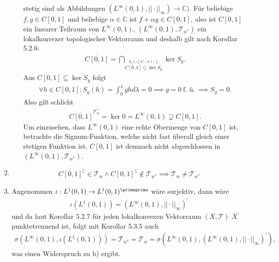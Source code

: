 \begin{solution}
\begin{enumerate}[label = (\alph*)]
\begin{enumerate}
      stetig sind als Abbildungen $(L^{\infty}(0,1),||\cdot||_{\infty}) \rightarrow \mathbb{C})$.
      Für beliebige $f,g \in C[0,1]$ und beliebige $\alpha \in \mathbb{C}$ ist $f + \alpha g \in C[0,1]$,
      also ist $C[0,1]$ ein linearer Teilraum von $L^{\infty}(0,1)$, $(L^{\infty}(0,1),\mathcal{T}_{w^*})$
      ein lokalkonvexer topologischer Vektorraum und deshalb
      gilt nach Korollar 5.2.6:
      \begin{align*}
        \overline{C[0,1]} = \bigcap_{\stackrel{S_g \in \iota(L^1(0,1))}{C[0,1] \subseteq \ker S_g}} \ker S_g.
      \end{align*}
      Aus $C[0,1] \subseteq \ker S_g$ folgt
      \begin{align*}
        \forall h \in C[0,1]: S_g(h) = \int_0^1 gh d\lambda = 0
        \implies g = 0 ~\text{f. ü.}~ \implies S_g = 0.
      \end{align*}
      Also gilt schlicht
      \begin{align*}
        \overline{C[0,1]}^{\mathcal{T}_w^*} = \ker 0 = L^{\infty}(0,1) \supsetneq C[0,1].
      \end{align*}
      Um einzusehen, dass $L^{\infty}(0,1)$ eine echte Obermenge von $C[0,1]$ ist,
      betrachte die Signum-Funktion, welche nicht fast überall gleich einer stetigen
      Funktion ist.
      $C[0,1]$ ist demnach nicht abgeschlossen in $(L^{\infty}(0,1),\mathcal{T}_{w^*})$.
    \end{enumerate}
    \item
    \begin{align*}
      C[0,1]^{\complement} \in \mathcal{T}_w \land C[0,1]^{\complement} \notin \mathcal{T}_{w^*} \implies
      \mathcal{T}_w \neq \mathcal{T}_{w^*}
    \end{align*}
    \item Angenommen $\iota: L^1(0,1) \rightarrow L^1(0,1)^{\primeprime}$ wäre
    surjektiv, dann wäre
    \begin{align*}
      \iota(L^1(0,1)) = (L^{\infty}(0,1), ||\cdot||_{\infty})^{\prime}
    \end{align*}
    und da laut Korollar 5.2.7 für jeden lokalkonvexen Vektorraum $(X,\mathcal{T})$
    $X^{\prime}$ punktetrennend ist, folgt mit Korollar 5.3.5 auch
    \begin{align*}
    \sigma(L^{\infty}(0,1),\iota(L^1(0,1))) = \mathcal{T}_{w^*} = \mathcal{T}_w =
    \sigma(L^{\infty}(0,1),(L^{\infty}(0,1), ||\cdot||_{\infty})^{\prime}),
    \end{align*}
    was einen Widerspruch zu b) ergibt.
  \end{enumerate}
\end{solution}
